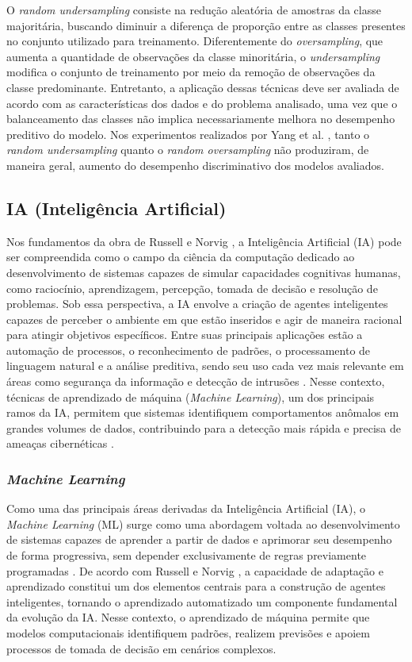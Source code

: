 \documentclass[
    12pt,                %
    openright,           %
    oneside,             %
    a4paper,             %
    english,             %
    brazil               %
]{abntex2}
\begin{document}
O \textit{random undersampling} consiste na redução aleatória de amostras da classe majoritária, buscando diminuir a diferença de proporção entre as classes presentes no conjunto utilizado para treinamento. Diferentemente do \textit{oversampling}, que aumenta a quantidade de observações da classe minoritária, o \textit{undersampling} modifica o conjunto de treinamento por meio da remoção de observações da classe predominante. Entretanto, a aplicação dessas técnicas deve ser avaliada de acordo com as características dos dados e do problema analisado, uma vez que o balanceamento das classes não implica necessariamente melhora no desempenho preditivo do modelo. Nos experimentos realizados por Yang et al. \cite{yang2024}, tanto o \textit{random undersampling} quanto o \textit{random oversampling} não produziram, de maneira geral, aumento do desempenho discriminativo dos modelos avaliados.

\subsection{IA (Inteligência Artificial)}

Nos fundamentos da obra de Russell e Norvig \cite{russell2010}, a Inteligência Artificial (IA) pode ser compreendida como o campo da ciência da computação dedicado ao desenvolvimento de sistemas capazes de simular capacidades cognitivas humanas, como raciocínio, aprendizagem, percepção, tomada de decisão e resolução de problemas. Sob essa perspectiva, a IA envolve a criação de agentes inteligentes capazes de perceber o ambiente em que estão inseridos e agir de maneira racional para atingir objetivos específicos. Entre suas principais aplicações estão a automação de processos, o reconhecimento de padrões, o processamento de linguagem natural e a análise preditiva, sendo seu uso cada vez mais relevante em áreas como segurança da informação e detecção de intrusões \cite{russell2010}. Nesse contexto, técnicas de aprendizado de máquina (\textit{Machine Learning}), um dos principais ramos da IA, permitem que sistemas identifiquem comportamentos anômalos em grandes volumes de dados, contribuindo para a detecção mais rápida e precisa de ameaças cibernéticas \cite{russell2010}.

\subsubsection{\textit{Machine Learning}}

Como uma das principais áreas derivadas da Inteligência Artificial (IA), o \textit{Machine Learning} (ML) surge como uma abordagem voltada ao desenvolvimento de sistemas capazes de aprender a partir de dados e aprimorar seu desempenho de forma progressiva, sem depender exclusivamente de regras previamente programadas \cite{russell2010,mitchell1997}. De acordo com Russell e Norvig \cite{russell2010}, a capacidade de adaptação e aprendizado constitui um dos elementos centrais para a construção de agentes inteligentes, tornando o aprendizado automatizado um componente fundamental da evolução da IA. Nesse contexto, o aprendizado de máquina permite que modelos computacionais identifiquem padrões, realizem previsões e apoiem processos de tomada de decisão em cenários complexos.
\end{document}
